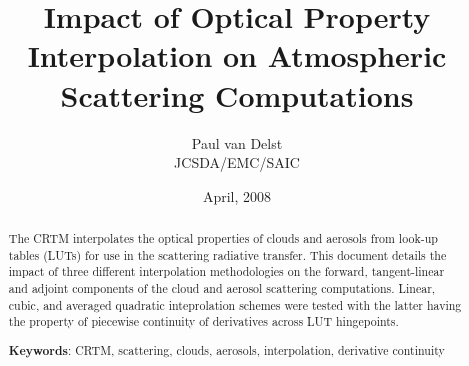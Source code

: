 




\newcommand{\rb}[1]{\raisebox{1.5ex}[0pt]{#1}}
\newcommand{\po}{\ensuremath{p_{0}}}
\newcommand{\bpo}{\boldmath\po\unboldmath}
\newcommand{\Dp}{\ensuremath{\Delta p}}
\newcommand{\bDp}{\boldmath\Dp\unboldmath}
\newcommand{\reff}{\ensuremath{R_{eff}}}
\newcommand{\breff}{\boldmath\reff\unboldmath}
\newcommand{\bhpa}{\textbf{(hPa)}}
\newcommand{\bmicron}{\boldmath\micron\unboldmath}

\title{Impact of Optical Property Interpolation on Atmospheric Scattering Computations}
\author{Paul van Delst\\JCSDA/EMC/SAIC}
\date{April, 2008}



\maketitle


\begin{abstract}
The CRTM interpolates the optical properties of clouds and aerosols from look-up tables (LUTs) for use in the scattering radiative transfer. This document details the impact of three different interpolation methodologies on the forward, tangent-linear and adjoint components of the cloud and aerosol scattering computations. Linear, cubic, and averaged quadratic inteprolation schemes were tested with the latter having the property of piecewise continuity of derivatives across LUT hingepoints.

\textbf{Keywords}: CRTM, scattering, clouds, aerosols, interpolation, derivative continuity
\end{abstract}


